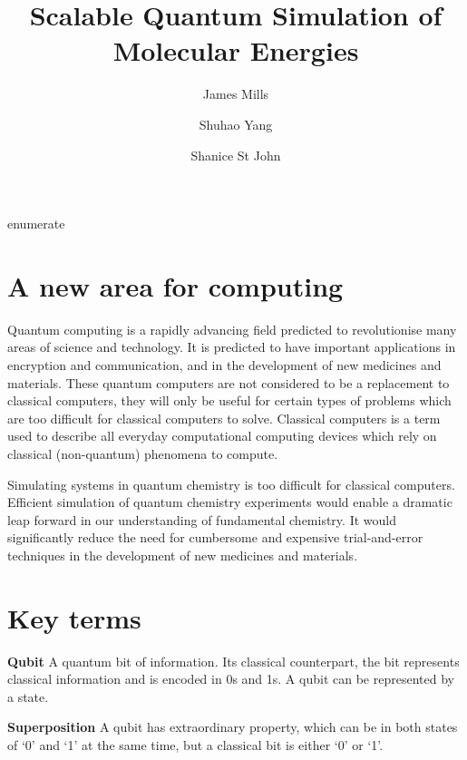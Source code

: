 enumerate\documentclass[14pt,landscape,color=UCLdarkred,margin=3cm]{uclposter}
\title{Scalable Quantum Simulation of Molecular Energies}
\author{James Mills}
\author{Shuhao Yang}
\author{Shanice St John}
\affil[1]{MSc Quantum Technologies, UCL}
\begin{document}

\maketitle

\begin{multicols}{3}

\section*{A new area for computing}


Quantum computing is a rapidly advancing field predicted to revolutionise many
areas of science and technology. It is predicted to have important applications in encryption and communication, and in the development of new medicines and materials. These quantum computers are not considered to be a replacement to classical computers, they will only be useful for certain types of problems which are too difficult for classical computers to solve. Classical computers is a term used to describe all everyday computational computing devices which rely on classical (non-quantum) phenomena to compute.

Simulating systems in quantum chemistry is too difficult for classical computers. Efficient simulation of quantum chemistry experiments would enable a dramatic leap forward in our understanding of fundamental chemistry. It would significantly reduce the need for cumbersome and expensive trial-and-error techniques in the development of new medicines and materials.

\section*{Key terms}


\begin{highlightbox}
	\textbf{Qubit} A quantum bit of information. Its classical counterpart, the bit represents classical information and is encoded in 0s and 1s. A qubit can be represented by a state.
\end{highlightbox}

\begin{highlightbox}
  \textbf{Superposition} A qubit has extraordinary property, which can be in both states of `0' and `1' at the same time, but a classical bit is either `0' or `1'.
\end{highlightbox}




\end{multicols}
\end{document}

